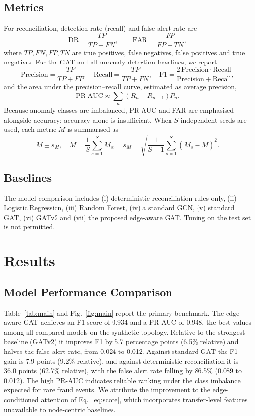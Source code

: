 \documentclass[conference,a4paper]{IEEEtran}
\begin{document}
\subsection{Metrics}
For reconciliation, detection rate (recall) and false-alert rate are
\begin{equation}
\mathrm{DR}=\frac{TP}{TP+FN},\qquad \mathrm{FAR}=\frac{FP}{FP+TN},
\label{eq:drfar}
\end{equation}
where $TP,FN,FP,TN$ are true positives, false negatives, false positives and true negatives. For the GAT and all anomaly-detection baselines, we report
\begin{equation}
\mathrm{Precision}=\frac{TP}{TP+FP},\quad \mathrm{Recall}=\frac{TP}{TP+FN},\quad \mathrm{F1}=\frac{2\,\mathrm{Precision}\cdot\mathrm{Recall}}{\mathrm{Precision}+\mathrm{Recall}},
\label{eq:prf}
\end{equation}
and the area under the precision--recall curve, estimated as average precision,
\begin{equation}
\text{PR-AUC}\approx\sum_n(R_n-R_{n-1})P_n.
\label{eq:prauc}
\end{equation}
Because anomaly classes are imbalanced, PR-AUC and FAR are emphasised alongside accuracy; accuracy alone is insufficient. When $S$ independent seeds are used, each metric $M$ is summarised as
\begin{equation}
\bar M\pm s_M,\quad \bar M=\frac1S\sum_{s=1}^{S}M_s,\quad s_M=\sqrt{\frac{1}{S-1}\sum_{s=1}^{S}(M_s-\bar M)^2}.
\label{eq:meanstd}
\end{equation}

\subsection{Baselines}
The model comparison includes (i) deterministic reconciliation rules only, (ii) Logistic Regression, (iii) Random Forest, (iv) a standard GCN, (v) standard GAT, (vi) GATv2 and (vii) the proposed edge-aware GAT. Tuning on the test set is not permitted.

\section{Results}
\subsection{Model Performance Comparison}
Table~\ref{tab:main} and Fig.~\ref{fig:main} report the primary benchmark. The edge-aware GAT achieves an F1-score of 0.934 and a PR-AUC of 0.948, the best values among all compared models on the synthetic topology. Relative to the strongest baseline (GATv2) it improves F1 by 5.7 percentage points (6.5\% relative) and halves the false alert rate, from 0.024 to 0.012. Against standard GAT the F1 gain is 7.9 points (9.2\% relative), and against deterministic reconciliation it is 36.0 points (62.7\% relative), with the false alert rate falling by 86.5\% (0.089 to 0.012). The high PR-AUC indicates reliable ranking under the class imbalance expected for rare fraud events. We attribute the improvement to the edge-conditioned attention of Eq.~\eqref{eq:score}, which incorporates transfer-level features unavailable to node-centric baselines.
\end{document}
